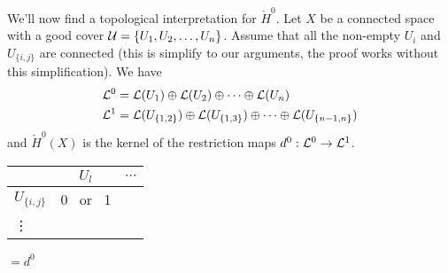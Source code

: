 

We'll now find a topological interpretation for $\check H^0$. Let $X$ be a connected space with a good cover $\mathcal{U} = \{ U_1, U_2, \dots, U_n\}$. Assume that all the non-empty $U_i$ and $U_{\{i,j\}}$ are connected (this is simplify to our arguments, the proof works without this simplification). We have
\begin{align*}
  \mathcal{L}^0 &= \mathcal{L}(U_1) \oplus \mathcal{L}(U_2) \oplus \dots \oplus \mathcal{L}(U_n) \\
  \mathcal{L}^1 &= \mathcal{L}(U_{\{1,2\}}) \oplus \mathcal{L}(U_{\{1,3\}}) \oplus \dots \oplus \mathcal{L}(U_{\{n-1,n\}})
\end{align*}
and $\check H^0(X)$ is the kernel of the restriction maps $d^0 : \mathcal{L}^0 \rightarrow \mathcal{L}^1$. \begin{center}
  \begin{tabular}{ l | c c  }
        & $U_l$ & $\cdots$ \\\hline
    $U_{\{i,j\}}$ &   0 \mbox{ or } 1    &      \\
    \vdots &       &
  \end{tabular} $ = d^0$
\end{center}


